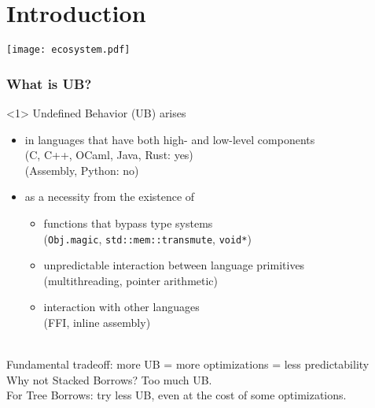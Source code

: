 \begin{frame}
    \titlepage
\end{frame}

\section{Introduction}


\begin{frame}
    \texttt{[image: ecosystem.pdf]}
\end{frame}

\begin{frame}[fragile,t]
    \frametitle{What is UB?}
    \begin{onlyenv}<1>
        Undefined Behavior (UB) arises
        \begin{itemize}
            \item in languages that have both high- and low-level components\\
                (C, C++, OCaml, Java, Rust: yes)\\
                (Assembly, Python: no)
            \item as a necessity from the existence of
                \begin{itemize}
                    \item functions that bypass type systems\\
                        (\texttt{Obj.magic}, \texttt{std::mem::transmute}, \texttt{void*})
                    \item unpredictable interaction between language primitives\\
                        (multithreading, pointer arithmetic)
                    \item interaction with other languages\\
                        (FFI, inline assembly)
                \end{itemize}
        \end{itemize}~\\
        Fundamental tradeoff: more UB = more optimizations = less predictability\\
        Why not Stacked Borrows? Too much UB.\\
        For Tree Borrows: try less UB, even at the cost of some optimizations.
    \end{onlyenv}
\end{frame}


